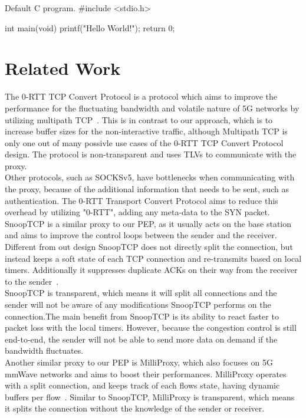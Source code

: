 \documentclass[a4paper,english, 11pt]{report}
\begin{document}
\begin{autonumlstlisting}[label=lst:hello_world]{Default C program.}
#include <stdio.h>

int main(void)
{
	printf("Hello World!");
	return 0;
}

\end{autonumlstlisting}

\section{Related Work}
The 0-RTT TCP Convert Protocol is a protocol which aims to improve the performance for the fluctuating bandwidth and volatile nature of 5G networks by utilizing multipath TCP~\cite{rfc8803}. This is in contrast to our approach, which is to increase buffer sizes for the non-interactive traffic, although Multipath TCP is only one out of many possivle use cases of the 0-RTT TCP Convert Protocol design. The protocol is non-transparent and uses TLVs to communicate with the proxy.\\

Other protocols, such as SOCKSv5, have bottlenecks when communicating with the proxy, because of the additional information that needs to be sent, such as authentication. The 0-RTT Transport Convert Protocol aims to reduce this overhead by utilizing "0-RTT", adding any meta-data to the SYN packet.\\

SnoopTCP is a similar proxy to our PEP, as it usually acts on the base station and aims to improve the control loops between the sender and the receiver. Different from out design SnoopTCP does not directly split the connection, but instead keeps a soft state of each TCP connection and re-transmits based on local timers. Additionally it suppresses duplicate ACKs on their way from the receiver to the sender~\cite{snooptcp}.\\

SnoopTCP is transparent, which means it will split all connections and the sender will not be aware of any modifications SnoopTCP performs on the connection.The main benefit from SnoopTCP is its ability to react faster to packet loss with the local timers. However, because the congestion control is still end-to-end, the sender will not be able to send more data on demand if the bandwidth fluctuates.\\

Another similar proxy to our PEP is MilliProxy, which also focuses on 5G mmWave networks and aims to boost their performances. MilliProxy operates with a split connection, and keeps track of each flows state, having dynamic buffers per flow~\cite{milliproxy}. Similar to SnoopTCP, MilliProxy is transparent, which means it splits the connection without the knowledge of the sender or receiver.\\
\end{document}
